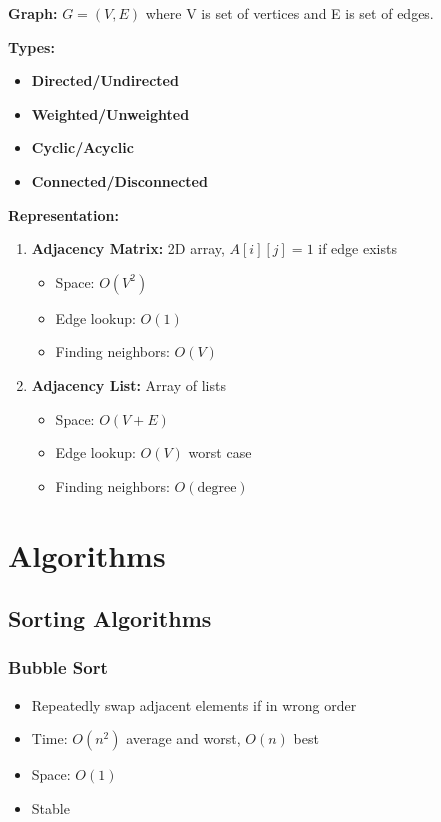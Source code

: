 \documentclass[11pt,a4paper]{article}
\begin{document}
\begin{defbox}
\textbf{Graph:} $G = (V, E)$ where V is set of vertices and E is set of edges.
\end{defbox}

\textbf{Types:}
\begin{itemize}
    \item \textbf{Directed/Undirected}
    \item \textbf{Weighted/Unweighted}
    \item \textbf{Cyclic/Acyclic}
    \item \textbf{Connected/Disconnected}
\end{itemize}

\textbf{Representation:}
\begin{enumerate}
    \item \textbf{Adjacency Matrix:} 2D array, $A[i][j] = 1$ if edge exists
    \begin{itemize}
        \item Space: $O(V^2)$
        \item Edge lookup: $O(1)$
        \item Finding neighbors: $O(V)$
    \end{itemize}
    \item \textbf{Adjacency List:} Array of lists
    \begin{itemize}
        \item Space: $O(V + E)$
        \item Edge lookup: $O(V)$ worst case
        \item Finding neighbors: $O(\text{degree})$
    \end{itemize}
\end{enumerate}

\section{Algorithms}

\subsection{Sorting Algorithms}

\subsubsection{Bubble Sort}
\begin{itemize}
    \item Repeatedly swap adjacent elements if in wrong order
    \item Time: $O(n^2)$ average and worst, $O(n)$ best
    \item Space: $O(1)$
    \item Stable
\end{itemize}
\end{document}
